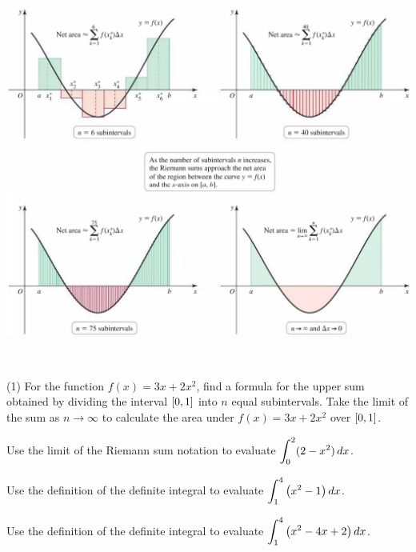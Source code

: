 \documentclass[answers]{exam}
\begin{document}
\begin{center}
  \includegraphics[width=0.85\linewidth]{images/briggs_05_02/fig5_20.png}
\end{center}
\pagebreak
\begin{ex*}~

  \begin{tasks}[after-item-skip=\stretch{1}](1)
    \task 
      For the function $f(x)=3x+2x^2$, find a formula for the upper sum obtained by dividing the interval ${\left[0,1\right]}$ into $n$ equal subintervals.
    \task 
      Take the limit of the sum as $n\to\infty$ to calculate the area under $f(x)=3x+2x^2$ over ${\left[0,1\right]}$.
  \end{tasks}
\end{ex*}
\pagebreak

\begin{ex*}
  Use the limit of the Riemann sum notation to evaluate $\displaystyle\int_0^2 (2-x^2)\,dx$.
\end{ex*}
\begin{ex*}
  Use the definition of the definite integral to evaluate $\displaystyle\int_1^4 {\left(x^2-1\right)}\,dx$.
\end{ex*}
\pagebreak

\begin{ex*}
  Use the definition of the definite integral to evaluate $\displaystyle\int_1^4 {\left(x^2-4x+2\right)}\,dx$.
\end{ex*}
\end{document}
